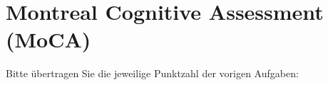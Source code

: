 
\setcounter{section}{12}  
\section{Montreal Cognitive Assessment (MoCA)}
\vspace{5ex}
\begin{choicequestion}[cols=3]{}
 \end{choicequestion} 
     \begin{choicequestion} [cols=3]{}     		    
      \end{choicequestion} 
 \vspace{1cm}
    \begin{choicequestion}[cols=4]{}
\end{choicequestion}

 \vspace{2cm}
Bitte übertragen Sie die jeweilige Punktzahl der vorigen Aufgaben: \\

